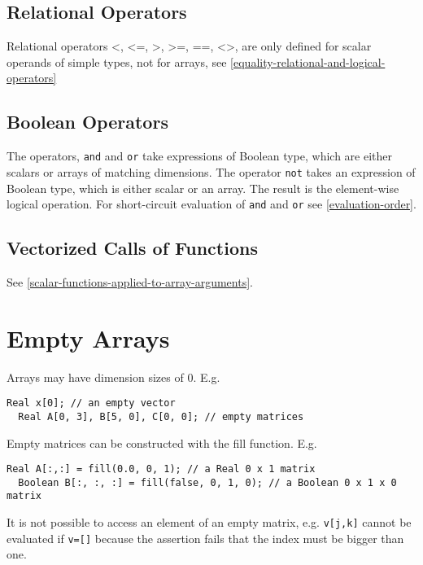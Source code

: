 \subsection{Relational Operators}

Relational operators \textless{}, \textless{}=, \textgreater{},
\textgreater{}=, ==, \textless{}\textgreater{}, are only defined for
scalar operands of simple types, not for arrays, see \autoref{equality-relational-and-logical-operators}

\subsection{Boolean Operators}

The operators, \lstinline!and! and \lstinline!or! take expressions of Boolean type, which are
either scalars or arrays of matching dimensions. The operator \lstinline!not! takes
an expression of Boolean type, which is either scalar or an array. The
result is the element-wise logical operation. For short-circuit
evaluation of \lstinline!and! and \lstinline!or! see \autoref{evaluation-order}.

\subsection{Vectorized Calls of Functions}

See \autoref{scalar-functions-applied-to-array-arguments}.

\section{Empty Arrays}

Arrays may have dimension sizes of 0. E.g.

\begin{lstlisting}[language=modelica]
  Real x[0]; // an empty vector
  Real A[0, 3], B[5, 0], C[0, 0]; // empty matrices
\end{lstlisting}
Empty matrices can be constructed with the fill function. E.g.

\begin{lstlisting}[language=modelica]
  Real A[:,:] = fill(0.0, 0, 1); // a Real 0 x 1 matrix
  Boolean B[:, :, :] = fill(false, 0, 1, 0); // a Boolean 0 x 1 x 0 matrix
\end{lstlisting}
It is not possible to access an element of an empty matrix, e.g.
  \lstinline!v[j,k]! cannot be evaluated if \lstinline!v=[]! because the assertion fails
that the index must be bigger than one.

